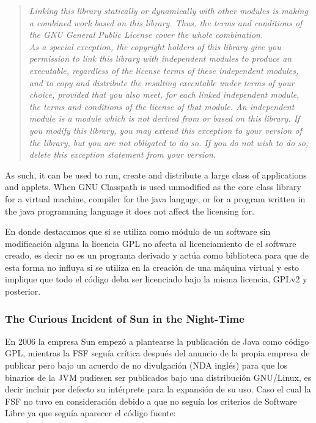 \documentclass[11pt]{scrartcl}
\begin{document}
\begin{quotation}
    \emph{Linking this library statically or dynamically with other modules is making a combined work based on this library. Thus, the terms and conditions of the GNU General Public License cover the whole combination.\\
    As a special exception, the copyright holders of this library give you permission to link this library with independent modules to produce an executable, regardless of the license terms of these independent modules, and to copy and distribute the resulting executable under terms of your choice, provided that you also meet, for each linked independent module, the terms and conditions of the license of that module. An independent module is a module which is not derived from or based on this library. If you modify this library, you may extend this exception to your version of the library, but you are not obligated to do so. If you do not wish to do so, delete this exception statement from your version.}
\end{quotation}

As such, it can be used to run, create and distribute a large class of applications and applets. When GNU Classpath is used unmodified as the core class library for a virtual machine, compiler for the java languge, or for a program written in the java programming language it does not affect the licensing for.

En donde destacamos que si se utiliza como módulo de un software sin modificación alguna la licencia GPL no afecta al licenciamiento de el software creado, es decir no es un programa derivado y actúa como biblioteca para que de esta forma no influya si se utiliza en la creación de una máquina virtual y esto implique que todo el código deba ser licenciado bajo la misma licencia, GPLv2 y posterior.

\subsubsection{The Curious Incident of Sun in the Night-Time}

En 2006 la empresa Sun empezó a plantearse la publicación de Java como código GPL, mientras la FSF seguía crítica después del anuncio de la propia empresa de publicar pero bajo un acuerdo de no divulgación (NDA inglés) para que los binarios de la JVM pudiesen ser publicados bajo una distribución GNU/Linux, es decir incluir por defecto su intérprete para la expansión de su uso. Caso el cual la FSF no tuvo en consideración debido a que no seguía los criterios de Software Libre ya que seguía aparecer el código fuente:
\end{document}
